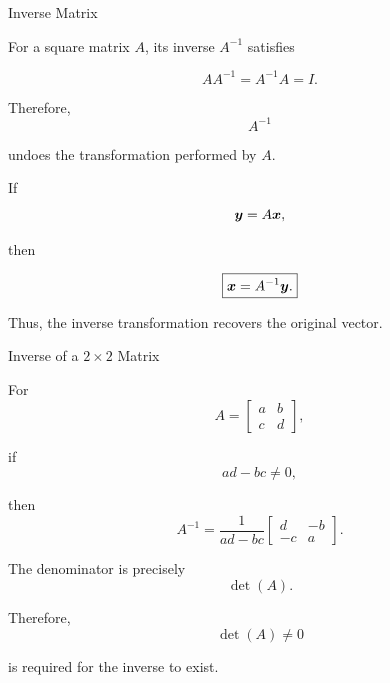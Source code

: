 
\begin{frame}{Inverse Matrix}

For a square matrix $A$, its inverse $A^{-1}$ satisfies

\[
\boxed{
AA^{-1}=A^{-1}A=I.
}
\]

Therefore,
\vspace{-0.1cm}
\[
A^{-1}
\]

undoes the transformation performed by $A$.

\vspace{0.5cm}

If
\vspace{-0.1cm}
\[
\bm{y}=A\bm{x},
\]

then

\[
\boxed{
\bm{x}=A^{-1}\bm{y}.
}
\]

Thus, the inverse transformation recovers the original vector.

\end{frame}



\begin{frame}{Inverse of a $2\times2$ Matrix}

For
\vspace{-0.1cm}
\[
A=
\begin{bmatrix}
a&b\\
c&d
\end{bmatrix},
\]

if
\vspace{-0.1cm}
\[
ad-bc\neq0,
\]

then
\vspace{-0.1cm}
\[
\boxed{
A^{-1}
=
\frac{1}{ad-bc}
\begin{bmatrix}
d&-b\\
-c&a
\end{bmatrix}.
}
\]

The denominator is precisely
\vspace{-0.1cm}
\[
\det(A).
\]

Therefore,
\vspace{-0.1cm}
\[
\det(A)\neq0
\]

is required for the inverse to exist.

\end{frame}


